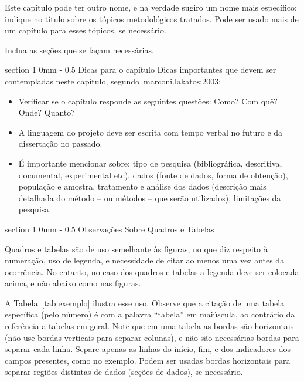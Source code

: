 \documentclass[a4paper, 12pt]{ppgeb}
\makeatletter
\renewcommand{\section}{\@startsection
{section}
{1}
{0mm}
{-\baselineskip}
{0.5\baselineskip}
{\large\bfseries\scshape}}
\makeatother
\begin{document}
Este capítulo pode ter outro nome, e na verdade sugiro um nome mais específico; indique no título sobre os tópicos metodológicos tratados. Pode ser usado mais de um capítulo para esses tópicos, se necessário.

Inclua as seções que se façam necessárias.

\section{Dicas para o capítulo}
Dicas importantes que devem ser contempladas neste capítulo, segundo~\cite{mainreferences}{marconi.lakatos:2003}:
\begin{itemize}
\item Verificar se o capítulo responde as seguintes questões: Como? Com quê? Onde? Quanto?
\item A linguagem do projeto deve ser escrita com tempo verbal no futuro e da dissertação no passado.
\item É importante mencionar sobre: tipo de pesquisa (bibliográfica, descritiva, documental, experimental etc), dados (fonte de dados, forma de obtenção), população e amostra, tratamento e análise dos dados (descrição mais detalhada do método -- ou métodos -- que serão utilizados), limitações da pesquisa.
\end{itemize}

\section{Observações Sobre Quadros e Tabelas}

Quadros e tabelas são de uso semelhante às figuras, no que diz respeito à numeração, uso de legenda, e necessidade de citar ao menos uma vez antes da ocorrência. No entanto, no caso dos quadros e tabelas a legenda deve ser colocada acima, e não abaixo como nas figuras.

A Tabela~\ref{tab:exemplo} ilustra esse uso. Observe que a citação de uma tabela específica (pelo número) é com a palavra ``tabela'' em maiúscula, ao contrário da referência a tabelas em geral. Note que em uma tabela as bordas são horizontais (não use bordas verticais para separar colunas), e não são necessárias bordas para separar cada linha. Separe apenas as linhas do início, fim, e dos indicadores dos campos presentes, como no exemplo. Podem ser usadas bordas horizontais para separar regiões distintas de dados (seções de dados), se necessário.
\end{document}
